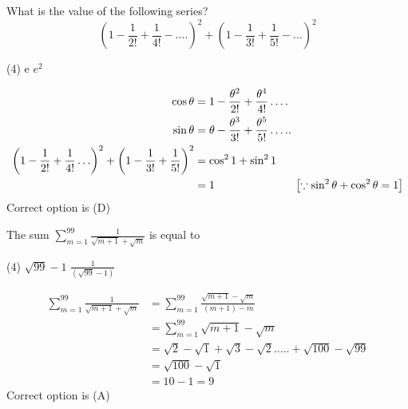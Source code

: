\begin{questions}
	\begin{minipage}{\textwidth}
		\question What is the value of the following series?
		$$\left(1-\frac{1}{2 !}+\frac{1}{4 !}-\ldots .\right)^{2}+\left(1-\frac{1}{3 !}+\frac{1}{5 !}-\ldots\right)^{2}$$
	\end{minipage}
	\begin{tasks}(4)
		\task[\textbf{B.}]e
		\task[\textbf{C.}]$e^{2}$
	\end{tasks}
	\begin{answer}
		\begin{align*}
		\cos \theta&=1-\frac{\theta^{2}}{2 !}+\frac{\theta^{4}}{4 !} \ldots . \\ \sin \theta&=\theta-\frac{\theta^{3}}{3 !}+\frac{\theta^{5}}{5 !} \ldots . .\\
		\left(1-\frac{1}{2 !}+\frac{1}{4 !} \ldots\right)^{2}+\left(1-\frac{1}{3 !}+\frac{1}{5 !}\right)^{2}&=\cos ^{2} 1+\sin ^{2} 1\\&=1 \hspace{2.5cm}\left[\because \sin ^{2} \theta+\cos ^{2} \theta=1\right]
		\end{align*}
		Correct option is (D)
	\end{answer}
	
	\begin{minipage}{\textwidth}
		\question The sum $\sum_{m=1}^{99} \frac{1}{\sqrt{m+1}+\sqrt{m}}$ is equal to\\
	\end{minipage}
	\begin{tasks}(4)
		\task[\textbf{B.}]$\sqrt{99}-1$
		\task[\textbf{C.}]$\frac{1}{(\sqrt{99}-1)}$
	\end{tasks}
	\begin{answer}
		\begin{align*}
		\sum_{m=1}^{99} \frac{1}{\sqrt{m+1}+\sqrt{m}}&=\sum_{m=1}^{99} \frac{\sqrt{m+1}-\sqrt{m}}{(m+1)-m}\\&=\sum_{m=1}^{99} \sqrt{m+1}-\sqrt{m}\\
		&=\sqrt{2}-\sqrt{1}+\sqrt{3}-\sqrt{2} \ldots . .+\sqrt{100}-\sqrt{99}\\&=\sqrt{100}-\sqrt{1}\\&=10-1=9
		\end{align*}
		Correct option is (A)
	\end{answer}
	

\end{questions}
